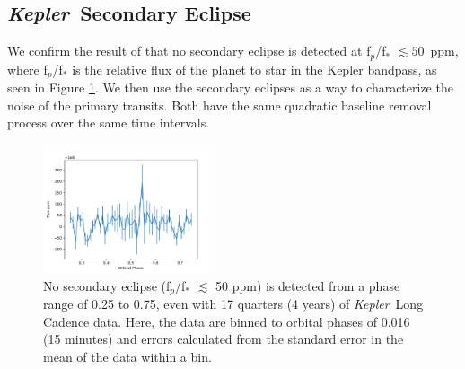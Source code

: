 \documentclass[preprint,trackchanges]{aastex61}
\newcommand{\kepler}{{\it Kepler}}
\begin{document}
\subsection{\kepler\ Secondary Eclipse}

We confirm the result of \citet{vanWerkhoven2014} that no secondary eclipse is detected at f$_p$/f$_*$ $\lesssim 50$~ppm, where f$_p$/f$_*$ is the relative flux of the planet to star in the Kepler bandpass, as seen in Figure \ref{fig:secEclipse}.
We then use the secondary eclipses as a way to characterize the noise of the primary transits.
Both have the same quadratic baseline removal process over the same time intervals.

\begin{figure}[!hbtp]
\begin{centering}
\includegraphics[width=0.45\textwidth]{secondary_eclipse.pdf}
\caption{No secondary eclipse (f$_p$/f$_*$ $\lesssim$ 50 ppm) is detected from a phase range of 0.25 to 0.75, even with 17 quarters (4 years) of \kepler\ Long Cadence data.
Here, the data are binned to orbital phases of 0.016 (15 minutes) and errors calculated from the standard error in the mean of the data within a bin.
}\label{fig:secEclipse}
\end{centering}
\end{figure}
\end{document}
